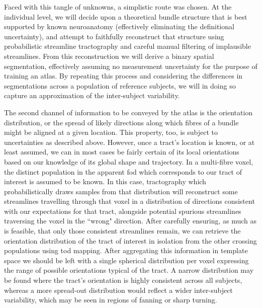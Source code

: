 Faced with this tangle of unknowns, a simplistic route was chosen.
At the individual level, we will decide upon a theoretical bundle structure that is best supported by known neuroanatomy (effectively eliminating the definitional uncertainty), and attempt to faithfully reconstruct that structure using probabilistic streamline tractography and careful manual filtering of implausible streamlines.
From this reconstruction we will derive a binary spatial segmentation, effectively assuming no measurement uncertainty for the purpose of training an atlas. %
By repeating this process and considering the differences in segmentations across a population of reference subjects, we will in doing so capture an approximation of the inter-subject variability.

The second channel of information to be conveyed by the atlas is the orientation distribution, or the spread of likely directions along which fibres of a bundle might be aligned at a given location.
This property, too, is subject to uncertainties as described above.
However, once a tract's location is known, or at least assumed, we can in most cases be fairly certain of its local orientations based on our knowledge of its global shape and trajectory.
In a multi-fibre voxel, the distinct population in the apparent \gls{fod} which corresponds to our tract of interest is assumed to be known.
In this case, tractography which probabilistically draws samples from that distribution will reconstruct some streamlines travelling through that voxel in a distribution of directions consistent with our expectations for that tract, alongside potential spurious streamlines traversing the voxel in the ``wrong" direction.
After carefully ensuring, as much as is feasible, that only those consistent streamlines remain, we can retrieve the orientation distribution of the tract of interest in isolation from the other crossing populations using \gls{tod} mapping.
After aggregating this information in template space we should be left with a single spherical distribution per voxel expressing the range of possible orientations typical of the tract.
A narrow distribution may be found where the tract's orientation is highly consistent across all subjects, whereas a more spread-out distribution would reflect a wider inter-subject variability, which may be seen in regions of fanning or sharp turning.


